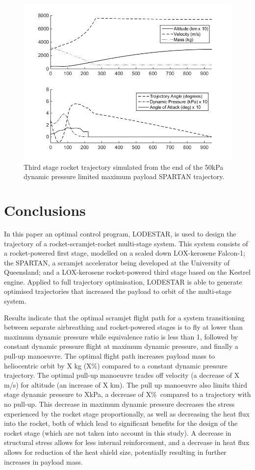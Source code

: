 \documentclass[]{aiaa-tc}
\newcommand{\PayloadImprovement}{X\%}
\newcommand{\qDecrease}{X\%}
\newcommand{\SeparationqFiftykPa}{X}
\begin{document}
\begin{figure}[H]
	
	\centering
	\includegraphics[width=0.8\linewidth]{ThirdStage50kpaConstrained}
	\caption{Third stage rocket trajectory simulated from the end of the 50kPa dynamic pressure limited maximum payload SPARTAN trajectory.}
	\label{fig:ThirdStage50kPa}
\end{figure}

\section{Conclusions}


In this paper an optimal control program, LODESTAR, is used to design the trajectory of a rocket-scramjet-rocket multi-stage system. This system consists of a rocket-powered first stage, modelled on a scaled down LOX-kerosene Falcon-1; the SPARTAN, a scramjet accelerator being developed at the University of Queensland; and a LOX-kerosene rocket-powered third stage based on the Kestrel engine. Applied to full trajectory optimisation, LODESTAR is able to generate optimised trajectories that increased the payload to orbit of the multi-stage system.

  Results indicate that the optimal scramjet flight path for a system transitioning between separate airbreathing and rocket-powered stages is to fly at lower than maximum dynamic pressure while equivalence ratio is less than 1, followed by constant dynamic pressure flight at maximum dynamic pressure, and finally a pull-up manoeuvre. The optimal flight path increases payload mass to heliocentric orbit by X kg (\PayloadImprovement) compared to a constant dynamic pressure trajectory. The optimal pull-up manoeuvre trades off velocity (a decrease of X m/s) for altitude (an increase of X km). The pull up manoeuvre also limits third stage dynamic pressure to \SeparationqFiftykPa kPa, a decrease of \qDecrease\ compared to a trajectory with no pull-up. This decrease in maximum dynamic pressure decreases the stress experienced by the rocket stage proportionally, as well as decreasing the heat flux into the rocket, both of which lead to significant benefits for the design of the rocket stage (which are not taken into account in this study). A decrease in structural stress allows for less internal reinforcement, and a decrease in heat flux allows for reduction of the heat shield size, potentially resulting in further increases in payload mass.
  
\end{document}
